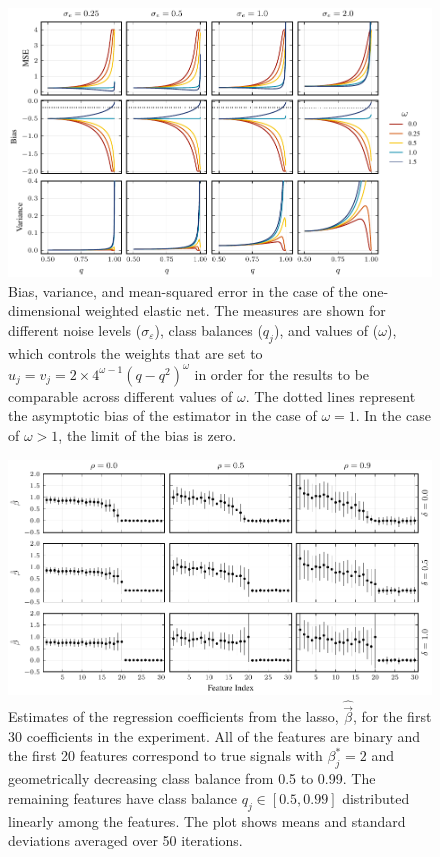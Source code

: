 \begin{figure}[htpb]
  \centering
  \includegraphics[]{plots/binary_onedim_bias_var_elnet.pdf}
  \caption{%
    Bias, variance, and mean-squared error in the case of the one-dimensional weighted elastic
    net. The measures are shown for different noise levels (\(\sigma_\varepsilon\)), class
    balances (\(q_j\)), and values of (\(\omega\)), which controls the weights that are set to
    \(u_j = v_j = 2\times 4^{\omega - 1}(q-q^2)^\omega\) in order for the results to be
    comparable across different values of \(\omega\). The dotted lines represent the asymptotic
    bias of the estimator in the case of \(\omega = 1\). In the case of \(\omega > 1\), the
    limit of the bias is zero.
  }
  \label{fig:binary-onedim-bias-var-elnet-full}
\end{figure}

\begin{figure}[htpb]
  \centering
  \includegraphics[]{plots/binary_decreasing.pdf}
  \caption{%
    Estimates of the regression coefficients from the lasso, \(\hat{\vec{\beta}}\), for the
    first 30 coefficients in the experiment. All of the features are binary and the first 20
    features correspond to true signals with \(\beta_j^* = 2\) and geometrically decreasing
    class balance from 0.5 to 0.99. The remaining features have class balance \(q_j \in [0.5,
      0.99]\) distributed linearly among the features. The plot shows means and standard
    deviations averaged over 50 iterations.
  }
  \label{fig:binary-decreasing-full}
\end{figure}

